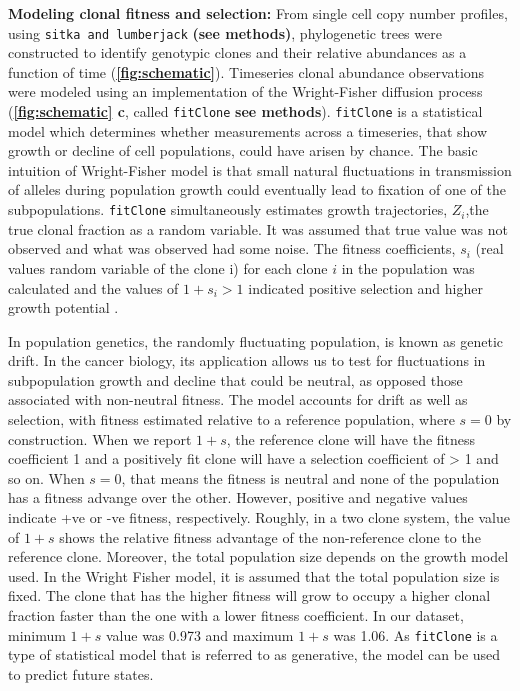 \textbf{Modeling clonal fitness and selection:} 
From single cell copy number profiles, using \texttt{sitka and lumberjack} \textbf{(see methods)}, phylogenetic trees were constructed to identify genotypic clones and their relative abundances as a function of time (\textbf{\autoref{fig:schematic}}).
Timeseries clonal abundance observations were modeled using an implementation of the Wright-Fisher diffusion process  (\textbf{\autoref{fig:schematic} c}, called \texttt{fitClone} \textbf{see methods}). \texttt{fitClone} is a statistical model which determines whether measurements across a timeseries, that show growth or decline of cell populations, could have arisen by chance.
The basic intuition of Wright-Fisher model is that small natural fluctuations in transmission of alleles during population growth could eventually lead to fixation of one of the subpopulations. \texttt{fitClone} simultaneously estimates growth trajectories, $Z_i$,the true clonal fraction as a random variable. It was assumed that true value was not observed and what was observed had some noise. The fitness coefficients, $s_i$ (real values random variable of the clone i) for each clone $i$ in the population was calculated and the values of $1+s_i>1$ indicated positive selection and higher growth potential \cite{salichos2020estimating}. 

In population genetics, the randomly fluctuating population, is known as genetic drift. In the cancer biology, its application allows us to test for fluctuations in subpopulation growth and decline that could be neutral, as opposed those associated with non-neutral fitness. 
The model accounts for drift as well as selection, with fitness estimated relative to a reference population, where $s=0$ by construction. When we report $1 + s$, the reference clone will have the fitness coefficient 1 and a positively fit clone will have a selection coefficient of > 1 and so on.
When $s=0$, that means the fitness is neutral and none of the population has a fitness advange over the other. However, positive and negative values indicate +ve or -ve fitness, respectively. Roughly, in a two clone system, the value of $1 + s$ shows the relative fitness advantage of the non-reference clone to the reference clone. Moreover, the total population size depends on the growth model used. In the Wright Fisher model, it is assumed that the total population size is fixed. The clone that has the higher fitness will grow to occupy a higher clonal fraction faster than the one with a lower fitness coefficient. In our dataset, minimum $1 + s$ value was 0.973 and maximum $1 + s$ was 1.06. 
As \texttt{fitClone} is a type of statistical model that is referred to as generative, the model can be used to predict future states.

